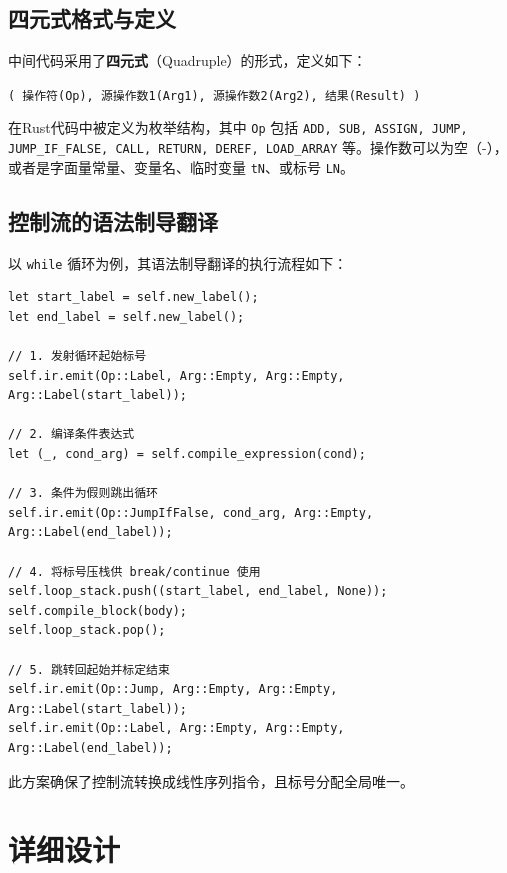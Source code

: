 \documentclass[12pt,a4paper]{ctexart}
\begin{document}
\subsection{四元式格式与定义}

中间代码采用了\textbf{四元式}（Quadruple）的形式，定义如下：
\begin{center}
    \texttt{( 操作符(Op), 源操作数1(Arg1), 源操作数2(Arg2), 结果(Result) )}
\end{center}
在Rust代码中被定义为枚举结构，其中 \texttt{Op} 包括 \texttt{ADD, SUB, ASSIGN, JUMP, JUMP\_IF\_FALSE, CALL, RETURN, DEREF, LOAD\_ARRAY} 等。操作数可以为空（-），或者是字面量常量、变量名、临时变量 \texttt{tN}、或标号 \texttt{LN}。

\subsection{控制流的语法制导翻译}

以 \texttt{while} 循环为例，其语法制导翻译的执行流程如下：
\begin{lstlisting}[language=RustLike]
let start_label = self.new_label();
let end_label = self.new_label();

// 1. 发射循环起始标号
self.ir.emit(Op::Label, Arg::Empty, Arg::Empty, Arg::Label(start_label));

// 2. 编译条件表达式
let (_, cond_arg) = self.compile_expression(cond);

// 3. 条件为假则跳出循环
self.ir.emit(Op::JumpIfFalse, cond_arg, Arg::Empty, Arg::Label(end_label));

// 4. 将标号压栈供 break/continue 使用
self.loop_stack.push((start_label, end_label, None));
self.compile_block(body);
self.loop_stack.pop();

// 5. 跳转回起始并标定结束
self.ir.emit(Op::Jump, Arg::Empty, Arg::Empty, Arg::Label(start_label));
self.ir.emit(Op::Label, Arg::Empty, Arg::Empty, Arg::Label(end_label));
\end{lstlisting}
此方案确保了控制流转换成线性序列指令，且标号分配全局唯一。

\section{详细设计}
\end{document}
